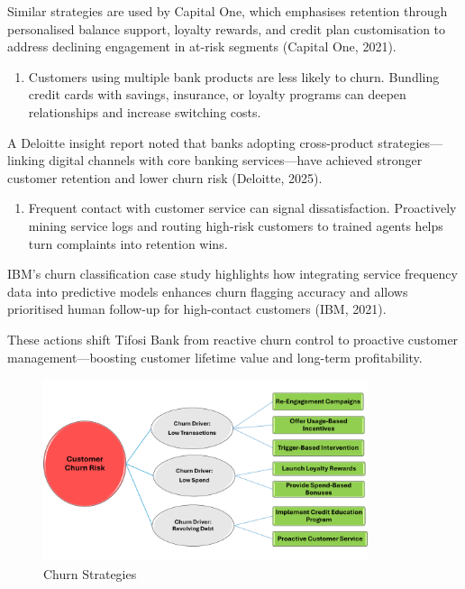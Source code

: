 \documentclass[
  letterpaper,
  DIV=11,
  numbers=noendperiod]{scrartcl}
\providecommand{\tightlist}{%
  \setlength{\itemsep}{0pt}\setlength{\parskip}{0pt}}\usepackage{longtable,booktabs,array}
\begin{document}
Similar strategies are used by Capital One, which emphasises retention
through personalised balance support, loyalty rewards, and credit plan
customisation to address declining engagement in at-risk segments
(Capital One, 2021).

\begin{enumerate}
\def\labelenumi{\arabic{enumi}.}
\setcounter{enumi}{2}
\tightlist
\item
  Customers using multiple bank products are less likely to churn.
  Bundling credit cards with savings, insurance, or loyalty programs can
  deepen relationships and increase switching costs.
\end{enumerate}

A Deloitte insight report noted that banks adopting cross-product
strategies---linking digital channels with core banking services---have
achieved stronger customer retention and lower churn risk (Deloitte,
2025).

\begin{enumerate}
\def\labelenumi{\arabic{enumi}.}
\setcounter{enumi}{3}
\tightlist
\item
  Frequent contact with customer service can signal dissatisfaction.
  Proactively mining service logs and routing high-risk customers to
  trained agents helps turn complaints into retention wins.
\end{enumerate}

IBM's churn classification case study highlights how integrating service
frequency data into predictive models enhances churn flagging accuracy
and allows prioritised human follow-up for high-contact customers (IBM,
2021).

These actions shift Tifosi Bank from reactive churn control to proactive
customer management---boosting customer lifetime value and long-term
profitability.

\begin{figure}[H]

{\centering \includegraphics[width=0.85\textwidth,height=\textheight]{figures/strategy01.png}

}

\caption{Churn Strategies}

\end{figure}%
\end{document}
